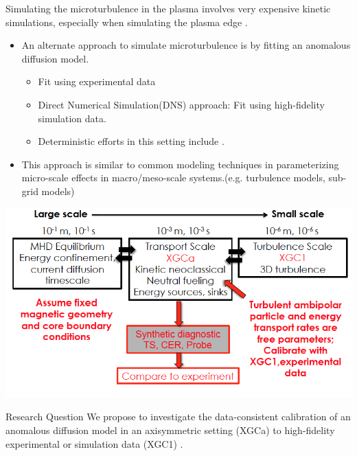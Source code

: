 \documentclass[11pt]{beamer}
\begin{document}
\begin{frame}
	
Simulating the microturbulence in the plasma involves very expensive kinetic simulations, 
especially when simulating the plasma edge \footnotemark[1]. 

\begin{itemize}
	\item An alternate approach to simulate microturbulence is by fitting an anomalous diffusion model.
	\begin{itemize} 
	\item Fit using  experimental data
 	\item Direct Numerical Simulation(DNS) approach: Fit using high-fidelity simulation data.
 	\item Deterministic efforts in this setting include \footnotemark[2]. 
\end{itemize}
\item This approach is similar to common modeling techniques in  parameterizing micro-scale
effects in macro/meso-scale systems.(e.g. turbulence models, sub-grid models) 

 \end{itemize}
 


\end{frame}
 
 \begin{frame}
 
 \centerline{ \includegraphics[height=.6\textheight]{xgca_calibrate.png}}
 
 \begin{block}{Research Question}
 We propose to investigate the data-consistent calibration of an anomalous diffusion model in an axisymmetric setting (XGCa) to high-fidelity experimental or simulation data (XGC1) \footnotemark[1].
\end{block}
	

\end{frame}
\end{document}
